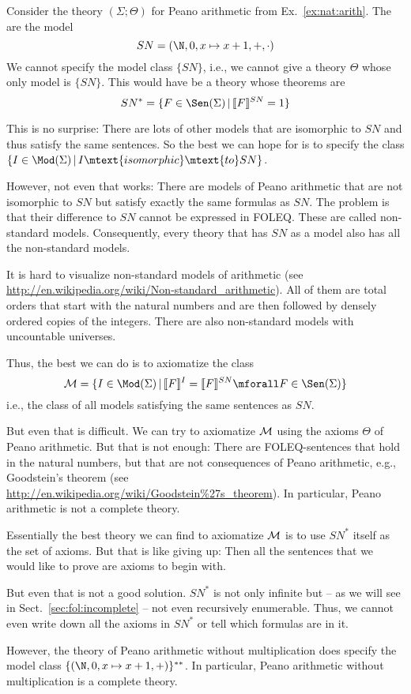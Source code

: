 \begin{example}\label{ex:nat:incomplete}
Consider the theory $(\Sigma;\Theta)$ for Peano arithmetic from Ex.~\ref{ex:nat:arith}.
The  are the model
 \[SN=(\N,0,x\mapsto x+1,+,\cdot)\]
We cannot specify the model class $\{SN\}$, i.e., we cannot give a theory $\Theta$ whose only model is $\{SN\}$.
This would have be a theory whose theorems are
 \[SN^*=\{F\in\Sen(\Sigma)\| \semm{F}{SN}=1\}\]

This is no surprise: There are lots of other models that are isomorphic to $SN$ and thus satisfy the same sentences.
So the best we can hope for is to specify the class $\{I\in\Mod(\Sigma)\| I\mtext{isomorphic}\mtext{to}SN\}$.

However, not even that works:
There are models of Peano arithmetic that are not isomorphic to $SN$ but satisfy exactly the same formulas as $SN$.
The problem is that their difference to $SN$ cannot be expressed in FOLEQ.
These are called non-standard models.
Consequently, every theory that has $SN$ as a model also has all the non-standard models.

It is hard to visualize non-standard models of arithmetic (see \url{http://en.wikipedia.org/wiki/Non-standard_arithmetic}).
All of them are total orders that start with the natural numbers and are then followed by densely ordered copies of the integers.
There are also non-standard models with uncountable universes.

Thus, the best we can do is to axiomatize the class
\[\sM=\{I\in\Mod(\Sigma)\| \semm{F}{I}=\semm{F}{SN} \mforall F\in\Sen(\Sigma)\}\]
i.e., the class of all models satisfying the same sentences as $SN$.

But even that is difficult.
We can try to axiomatize ${\cal M}$ using the axioms $\Theta$ of Peano arithmetic.
But that is not enough: There are FOLEQ-sentences that hold in the natural numbers, but that are not consequences of Peano arithmetic, e.g., Goodstein's theorem (see \url{http://en.wikipedia.org/wiki/Goodstein%27s_theorem}).
In particular, Peano arithmetic is not a complete theory.

Essentially the best theory we can find to axiomatize ${\cal M}$ is to use $SN^*$ itself as the set of axioms.
But that is like giving up: Then all the sentences that we would like to prove are axioms to begin with.

But even that is not a good solution.
$SN^*$ is not only infinite but -- as we will see in Sect.~\ref{sec:fol:incomplete} -- not even recursively enumerable.
Thus, we cannot even write down all the axioms in $SN^*$ or tell which formulas are in it.
\medskip

However, the theory of Peano arithmetic without multiplication does specify the model class $\{(\N,0,x\mapsto x+1,+)\}^{**}$.
In particular, Peano arithmetic without multiplication is a complete theory.
\end{example}

